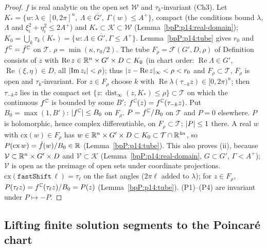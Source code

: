 \begin{proof}
\label{stepP:p14:pt-input} $\hat f$ is real analytic on the open set $\mathcal W$ and $\tau_k$-invariant (Ch3). Let $K_*=\{w:\lambda\in[0,2\pi]^n,\ \Lambda\in\overline{G'},\ \Gamma(w)\le A^+\}$, compact (the conditions bound $\lambda$, $\Lambda$ and $\xi_i^2+\eta_i^2\le2A^+$) and $K_*\subset\mathcal K\subset\mathcal W$ (Lemma~\ref{bpP:p14:real-domain}); $K_0=\bigcup_k\tau_k(K_*)=\{w:\Lambda\in\overline{G'},\Gamma\le A^+\}$. Lemma~\ref{bpP:p14:tube} gives $r_0$ and $f^{\mathbb{C}}=\hat f^{\mathbb{C}}$ on $\mathcal T$.
\label{stepP:p14:pt-rho} $\rho=\min(\kappa,r_0/2)$. The tube $F_\rho=\mathcal F(G',D,\rho)$ of Definition~ consists of $z$ with $\operatorname{Re}z\in\mathbb{R}^n\times G'\times D\subset K_0$ (in chart order: $\operatorname{Re}\Lambda\in G'$, $\operatorname{Re}(\xi,\eta)\in D$, all $\lvert \operatorname{Im}z_i\rvert<\rho$); thus $\lvert z-\operatorname{Re}z\rvert_\infty<\rho<r_0$ and $F_\rho\subset\mathcal T$, $F_\rho$ is open and $\tau_k$-invariant. For $z\in F_\rho$ choose $k$ with $\operatorname{Re}\lambda(\tau_{-k}z)\in[0,2\pi)^n$; then $\tau_{-k}z$ lies in the compact set $\{z:\operatorname{dist}_\infty(z,K_*)\le\rho\}\subset\mathcal T$ on which the continuous $f^{\mathbb{C}}$ is bounded by some $B'$; $f^{\mathbb{C}}(z)=f^{\mathbb{C}}(\tau_{-k}z)$. Put $B_0=\max(1,B')$: $\lvert f^{\mathbb{C}}\rvert\le B_0$ on $F_\rho$.
\label{stepP:p14:pt-def} $P=f^{\mathbb{C}}/B_0$ on $\mathcal T$ and $P=0$ elsewhere. 
\label{stepP:p14:pt-p12} $P$ is holomorphic, hence complex differentiable, on $F_\rho\subset\mathcal T$; $\lvert P\rvert\le1$ there.
\label{stepP:p14:pt-p3} A real $w$ with $\mathrm{cx}(w)\in F_\rho$ has $w\in\mathbb{R}^n\times G'\times D\subset K_0\subset\mathcal T\cap\mathbb{R}^{4n}$, so $P(\mathrm{cx}\,w)=\hat f(w)/B_0\in\mathbb{R}$ (Lemma~\ref{bpP:p14:tube}). This also proves (ii), because $\mathcal V\subset\mathbb{R}^n\times G'\times D$ and $\mathcal V\subset\mathcal K$ (Lemma~\ref{bpP:p14:real-domain}, $G\subset G'$, $\Gamma<A^+$); $\mathcal V$ is open as the preimage of open sets under coordinate projections.
\label{stepP:p14:pt-p4} $\mathrm{cx}(\texttt{fastShift}\,\ell)=\tau_\ell$ on the fast angles ($2\pi\ell$ added to $\lambda$); for $z\in F_\rho$, $P(\tau_\ell z)=f^{\mathbb{C}}(\tau_\ell z)/B_0=P(z)$ (Lemma~\ref{bpP:p14:tube}).
\label{stepP:p14:pt-neg} (P1)--(P4) are invariant under $P\mapsto-P$.
\end{proof}

\subsection{Lifting finite solution segments to the Poincar\'e chart}\label{bpP:p14:sec-lift}

